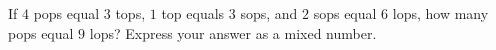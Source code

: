 If $4$ pops equal $3$ tops, $1$ top equals $3$ sops, and $2$ sops equal $6$ lops, how many pops equal $9$ lops? Express your answer as a mixed number.
